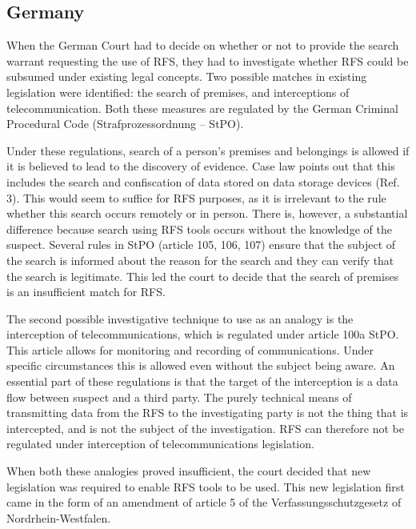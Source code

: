 \documentclass[11pt]{article} %
\begin{document}
\subsection{Germany}
When the German Court had to decide on whether or not to provide the search warrant requesting the use of RFS, they had to investigate whether RFS could be subsumed under existing legal concepts.
Two possible matches in existing legislation were identified: the search of premises, and interceptions of telecommunication.
Both these measures are regulated by the German Criminal Procedural Code (Strafprozessordnung – StPO).

Under these regulations, search of a person's premises and belongings is allowed if it is believed to lead to the discovery of evidence.
Case law points out that this includes the search and confiscation of data stored on data storage devices (Ref. 3). %
This would seem to suffice for RFS purposes, as it is irrelevant to the rule whether this search occurs remotely or in person.
There is, however, a substantial difference because search using RFS tools occurs without the knowledge of the suspect.
Several rules in StPO (article 105, 106, 107) ensure that the subject of the search is informed about the reason for the search and they can verify that the search is legitimate.
This led the court to decide that the search of premises is an insufficient match for RFS.

The second possible investigative technique to use as an analogy is the interception of telecommunications, which is regulated under article 100a StPO.
This article allows for monitoring and recording of communications.
Under specific circumstances this is allowed even without the subject being aware.
An essential part of these regulations is that the target of the interception is a data flow between suspect and a third party.
The purely technical means of transmitting data from the RFS to the investigating party is not the thing that is intercepted, and is not the subject of the investigation.
RFS can therefore not be regulated under interception of telecommunications legislation.

When both these analogies proved insufficient, the court decided that new legislation was required to enable RFS tools to be used.
This new legislation first came in the form of an amendment of article 5 of the Verfassungsschutzgesetz of Nordrhein-Westfalen.
\end{document}
